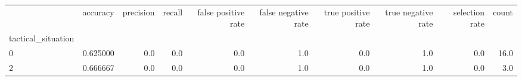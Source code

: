 \begin{tabular}{lrrrrrrrrr}
\toprule
{} &  accuracy &  precision &  recall &  false positive rate &  false negative rate &  true positive rate &  true negative rate &  selection rate &  count \\
tactical\_situation &           &            &         &                      &                      &                     &                     &                 &        \\
\midrule
0                  &  0.625000 &        0.0 &     0.0 &                  0.0 &                  1.0 &                 0.0 &                 1.0 &             0.0 &   16.0 \\
2                  &  0.666667 &        0.0 &     0.0 &                  0.0 &                  1.0 &                 0.0 &                 1.0 &             0.0 &    3.0 \\
\bottomrule
\end{tabular}

